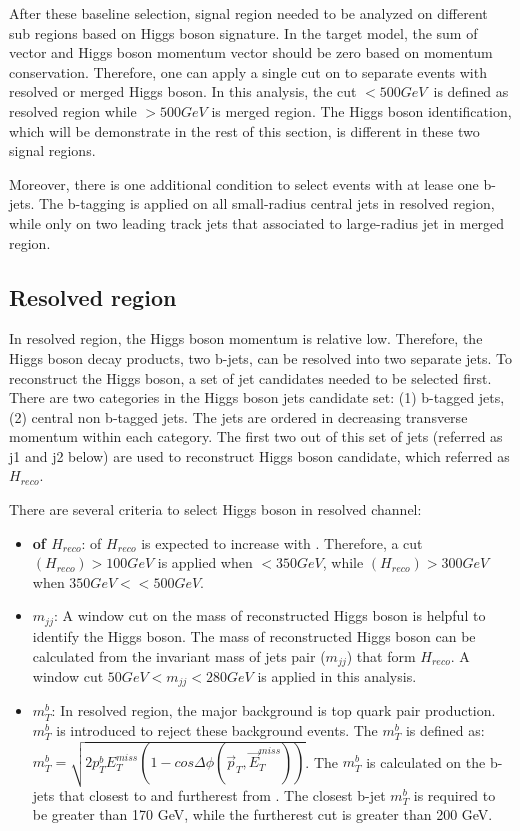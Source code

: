 \par After these baseline selection, signal region needed to be analyzed on different sub regions based on Higgs boson signature. In the target model, the sum of \met vector and Higgs boson momentum vector should be zero based on momentum conservation. Therefore, one can apply a single cut on \met to separate events with resolved or merged Higgs boson. In this analysis, the cut \met$<500GeV$~is defined as resolved region while \met$>500GeV$ is merged region. The Higgs boson identification, which will be demonstrate in the rest of this section, is different in these two signal regions.
\par Moreover, there is one additional condition to select events with at lease one b-jets. The b-tagging is applied on all small-radius central jets in resolved region, while only on two leading track jets that associated to large-radius jet in merged region.

\subsection{Resolved region}

\par In resolved region, the Higgs boson momentum is relative low. Therefore, the Higgs boson decay products, two b-jets, can be resolved into two separate jets. To reconstruct the Higgs boson, a set of jet candidates needed to be selected first. There are two categories in the Higgs boson jets candidate set: (1) b-tagged jets, (2) central non b-tagged jets. The jets are ordered in decreasing transverse momentum within each category. The first two out of this set of jets (referred as j1 and j2 below) are used to reconstruct Higgs boson candidate, which referred as $H_{reco}$.

\par There are several criteria to select Higgs boson in resolved channel:

\begin{itemize}
    \item \textbf{\pt of $H_{reco}$}: \pt of $H_{reco}$ is expected to increase with \met. Therefore, a cut \pt$(H_{reco})>100GeV$ is applied when \met $<350GeV$, while \pt$(H_{reco})>300GeV$ when $350GeV<$\met$<500GeV$.
    \item \textbf{$m_{jj}$}: A window cut on the mass of reconstructed Higgs boson is helpful to identify the Higgs boson. The mass of reconstructed Higgs boson can be calculated from the invariant mass of jets pair ($m_{jj}$) that form $H_{reco}$. A window cut $50GeV<m_{jj}<280GeV$ is applied in this analysis. 
    \item \textbf{$m_{T}^{b}$}: In resolved region, the major background is top quark pair production. $m_{T}^{b}$ is introduced to reject these background events. The $m_{T}^{b}$ is defined as: $m_{T}^{b}=\sqrt{2p_{T}^{b}E_{T}^{miss}(1-cos\Delta\phi(\vec{p}_{T}, \vec{E}_{T}^{miss}))}$. The $m_{T}^{b}$ is calculated on the b-jets that closest to and furtherest from \met. The closest b-jet $m_{T}^b$ is required to be greater than 170 GeV, while the furtherest cut is greater than 200 GeV.
\end{itemize}

